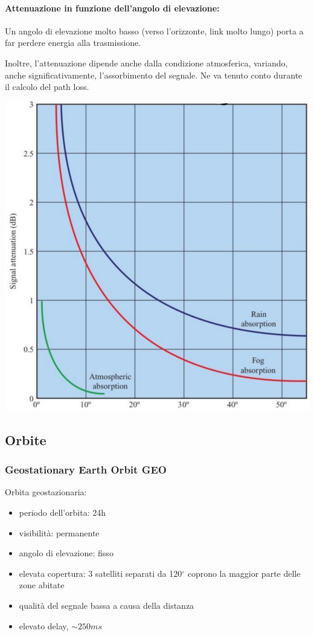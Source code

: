 \paragraph{Attenuazione in funzione dell'angolo di elevazione:} Un angolo di elevazione molto basso (verso l'orizzonte, link molto lungo) porta a far perdere energia alla trasmissione.

Inoltre, l'attenuazione dipende anche dalla condizione atmosferica, variando, anche significativamente, l'assorbimento del segnale. Ne va tenuto conto durante il calcolo del path loss.

\begin{center}
	\includegraphics[width=0.55\linewidth]{img/sat/atten}
\end{center}

\subsection{Orbite}

\subsubsection{Geostationary Earth Orbit GEO}

Orbita geostazionaria:
\begin{itemize}
	\item periodo dell'orbita: 24h
	\item visibilità: permanente
	\item angolo di elevazione: fisso
	\item elevata copertura: 3 satelliti separati da 120$^\circ$ coprono la maggior parte delle zone abitate
	\item qualità del segnale bassa a causa della distanza
	\item elevato delay, $\sim 250ms$
\end{itemize}

